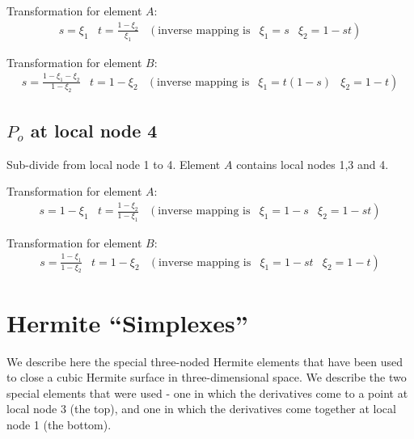 Transformation for element $A$:
\begin{displaymath}
\begin{array}{llllr}        
 s = \xi_{1} & t = \frac{1-\xi_{2}}{\xi_{1}} & 
  \left(\mbox{inverse mapping is}\right. & \xi_{1} = s & 
  \left.\xi_{2} = 1-st \right)
\end{array}
\end{displaymath}

Transformation for element $B$:
\begin{displaymath}
\begin{array}{llllr}        
 s = \frac{1-\xi_{1}-\xi_{2}}{1-\xi_{2}} & t = 1-\xi_{2} & 
  \left(\mbox{inverse mapping is}\right. & \xi_{1} = t(1-s) & 
  \left.\xi_{2} = 1-t \right)
\end{array}
\end{displaymath}

\subsection{$P_{o}$ at local node 4}
Sub-divide from local node 1 to 4.  Element $A$ contains local nodes 1,3 and 4.
        
Transformation for element $A$:
\begin{displaymath}
\begin{array}{llllr}        
 s = 1-\xi_{1} & t = \frac{1-\xi_{2}}{1-\xi_{1}} & 
  \left(\mbox{inverse mapping is}\right. & \xi_{1} = 1-s & 
  \left.\xi_{2} = 1-st \right)
\end{array}
\end{displaymath}

Transformation for element $B$:
\begin{displaymath}
\begin{array}{llllr}        
 s = \frac{1-\xi_{1}}{1-\xi_{2}} & t = 1-\xi_{2} & 
  \left(\mbox{inverse mapping is}\right. & \xi_{1} = 1-st & 
  \left.\xi_{2} = 1-t \right)
\end{array}
\end{displaymath}

\section{Hermite ``Simplexes''}

We describe here the special three-noded Hermite elements that have been used
to close a cubic Hermite surface in three-dimensional space. We describe the
two special elements that were used - one in which the derivatives come to a
point at local node 3 (the top), and one in which the derivatives come
together at local node 1 (the bottom).

